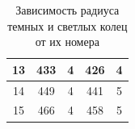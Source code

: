 \begin{table}[]
\begin{tabular}{|c|c|c|c|c|}
13                                                                   & 433                                                                                       & 4                                 & 426                                                                                          & 4                                  \\ \hline
14                                                                   & 449                                                                                       & 4                                 & 441                                                                                          & 5                                  \\ \hline
15                                                                   & 466                                                                                       & 4                                 & 458                                                                                          & 5                                  \\ \hline
\end{tabular}
\caption{Зависимость радиуса темных и светлых колец от их номера}
\label{rings}
\end{table}